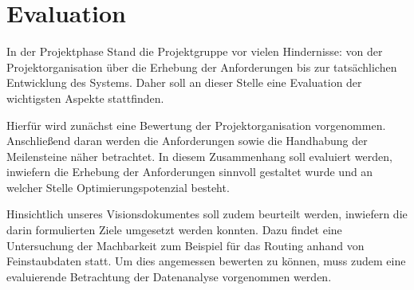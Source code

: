 \chapter{Evaluation}
In der Projektphase Stand die Projektgruppe vor vielen Hindernisse: von der Projektorganisation über die Erhebung der Anforderungen bis zur tatsächlichen Entwicklung des Systems. Daher soll an dieser Stelle eine Evaluation der wichtigsten Aspekte stattfinden. 

Hierfür wird zunächst eine Bewertung der Projektorganisation vorgenommen. Anschließend daran werden die Anforderungen sowie die Handhabung der Meilensteine näher betrachtet. In diesem Zusammenhang soll evaluiert werden, inwiefern die Erhebung der Anforderungen sinnvoll gestaltet wurde und an welcher Stelle Optimierungspotenzial besteht. 

Hinsichtlich unseres Visionsdokumentes soll zudem beurteilt werden, inwiefern die darin formulierten Ziele umgesetzt werden konnten. Dazu findet eine Untersuchung der Machbarkeit zum Beispiel für das Routing anhand von Feinstaubdaten statt. Um dies angemessen bewerten zu können, muss zudem eine evaluierende Betrachtung der Datenanalyse vorgenommen werden.


